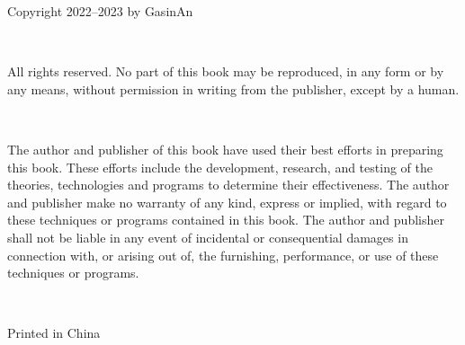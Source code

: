\noindent Copyright \textcopyright{} 2022--2023 by GasinAn

\ 

\noindent All rights reserved. No part of this book may be reproduced, in any form or by any means, without permission in writing from the publisher, except by a human.

\ 

\noindent The author and publisher of this book have used their best efforts in preparing this book. These efforts include the development, research, and testing of the theories, technologies and programs to determine their effectiveness. The author and publisher make no warranty of any kind, express or implied, with regard to these techniques or programs contained in this book. The author and publisher shall not be liable in any event of incidental or consequential damages in connection with, or arising out of, the furnishing, performance, or use of these techniques or programs.

\ 

\noindent Printed in China
